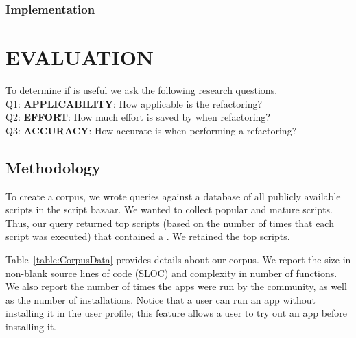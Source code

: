 \documentclass[article]{sigplanconf}
\begin{document}

\subsubsection{Implementation}


\section{EVALUATION}
\label{sec:evaluation}
To determine if \tool is useful we ask the following research questions.\\
Q1:  \textbf{APPLICABILITY}:  How applicable is the refactoring?\\
Q2:  \textbf{EFFORT}: How much effort is saved by \tool when refactoring?\\
Q3:  \textbf{ACCURACY}: How accurate is \tool when performing a refactoring?\\
 
\subsection{Methodology}

To create a corpus, we wrote queries against a database of all publicly available scripts in the \TD script bazaar. We wanted to collect popular and mature scripts. 
Thus, our query returned top scripts (based on the number of times that each script was executed) 
that contained a \NC{}. We retained the top \numScripts scripts.

Table~\ref{table:CorpusData} provides details about our corpus.  We report the size in non-blank source lines of code (SLOC) and complexity in number of functions.  We also report the number of times the apps were run by the \TD community, as well as the number of installations. Notice that a user can run an app without installing it in the user profile; this feature allows a \TD user to try out an app before installing it.
\end{document}
